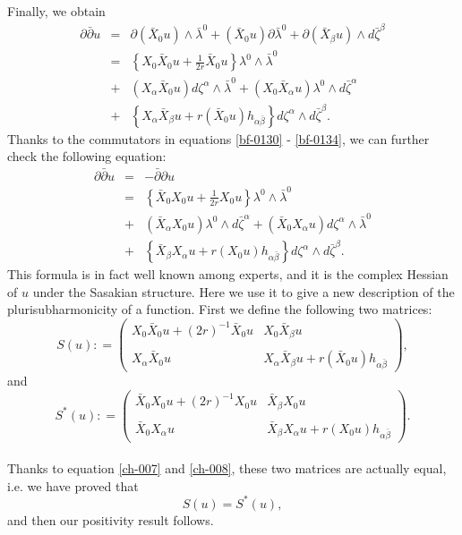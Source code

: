 \documentclass[a4paper,11pt]{amsart}
\numberwithin{equation}{section}
\def\ddbar{\partial\bar\partial}
\def\d{\partial}
\def\a{{\alpha}}
\def\z{{\zeta}}
\def\b{\beta}
\begin{document}
Finally, we obtain
\begin{eqnarray}
\label{ch-007}
\ddbar u &=& \d (\bar X_0 u) \wedge \bar\lambda^0 + (\bar X_0 u) \d \bar\lambda^0 + \d (\bar X_{\b} u) \wedge d\bar\z^{\b}
\nonumber\\
&=& \left\{ X_0 \bar X_0 u + \frac{1}{2r} \bar X_0 u \right\} \lambda^0 \wedge \bar\lambda^0
\nonumber\\
&+& \left( X_{\a} \bar X_0 u \right) d\z^{\a} \wedge \bar\lambda^0 + \left( X_0 \bar X_{\a} u \right) \lambda^0 \wedge d \bar\z^{\a}
\nonumber\\
&+& \left\{ X_{\a}\bar X_{\b} u  + r (\bar X_0 u) h_{\a\bar\b} \right\} d\z^{\a} \wedge d\bar\z^{\b}. 
\end{eqnarray}
Thanks to the commutators in equations \eqref{bf-0130} - \eqref{bf-0134}, 
we can further check the following equation:
\begin{eqnarray}
\label{ch-008}
\ddbar u &=& - \bar\d \d u 
\nonumber\\
&=& \left\{ \bar X_0  X_0 u + \frac{1}{2r}  X_0 u \right\} \lambda^0 \wedge \bar\lambda^0
\nonumber\\
&+& \left( \bar X_{\a} X_0 u \right) \lambda^0 \wedge d\bar\z^{\a} + \left( \bar X_0 X_{\a} u \right) d\z^{\a} \wedge \bar\lambda^0
\nonumber\\
&+& \left\{ \bar X_{\b} X_{\a} u  + r (X_0 u) h_{\a\bar\b} \right\} d\z^{\a} \wedge d\bar\z^{\b}. 
\end{eqnarray}
This formula is in fact well known among experts, 
and it is 
the complex Hessian of $u$ under the Sasakian structure.  
Here we use it to give a new description of 
the plurisubharmonicity of a function. 
First we define the following two matrices: 
\\
$$
S(u): = 
\begin{pmatrix}
X_0 \bar X_0 u +  (2r)^{-1} \bar X_0 u & X_0 \bar X_{\b} u \\
\\
X_{\a} \bar X_0 u &  X_{\a}\bar X_{\b} u + r (\bar X_0 u) h_{\a\bar\b}
\end{pmatrix}, 
$$
and 
$$
S^*(u): = 
\begin{pmatrix}
\bar X_0  X_0 u +  (2r)^{-1}  X_0 u & \bar X_{\b} X_0 u \\
\\
 \bar X_0 X_{\a} u &  \bar X_{\b} X_{\a} u + r ( X_0 u) h_{\a\bar\b}
\end{pmatrix}. 
$$
\\
Thanks to equation \eqref{ch-007} and \eqref{ch-008}, 
these two matrices are actually equal, i.e. we have proved that 
$$S(u) = S^*(u),$$ 
and then our positivity result follows. 
\end{document}
